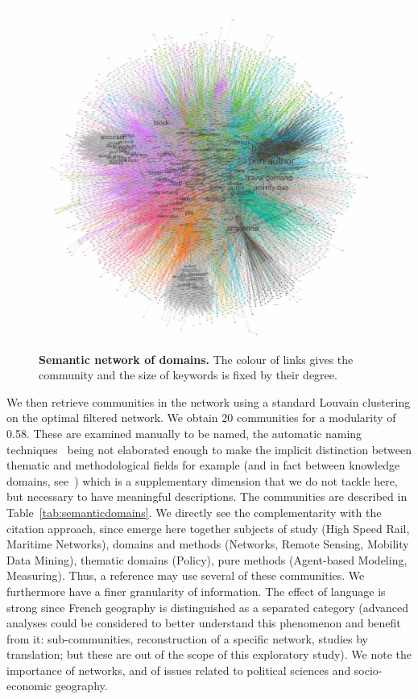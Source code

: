 \documentclass[10pt]{article}
\begin{document}
\begin{figure}
\includegraphics[width=\linewidth]{A-quantepistemo-semanticnw.jpg}
\caption{\textbf{Semantic network of domains.} The colour of links gives the community and the size of keywords is fixed by their degree.\label{fig:semanticnw}}
\end{figure}




We then retrieve communities in the network using a standard Louvain clustering on the optimal filtered network. We obtain 20 communities for a modularity of 0.58. These are examined manually to be named, the automatic naming techniques~\cite{yang2000improving} being not elaborated enough to make the implicit distinction between thematic and methodological fields for example (and in fact between knowledge domains, see~\cite{raimbault2017applied}) which is a supplementary dimension that we do not tackle here, but necessary to have meaningful descriptions. The communities are described in Table~\ref{tab:semanticdomains}. We directly see the complementarity with the citation approach, since emerge here together subjects of study (High Speed Rail, Maritime Networks), domains and methods (Networks, Remote Sensing, Mobility Data Mining), thematic domains (Policy), pure methods (Agent-based Modeling, Measuring). Thus, a reference may use several of these communities. We furthermore have a finer granularity of information. The effect of language is strong since French geography is distinguished as a separated category (advanced analyses could be considered to better understand this phenomenon and benefit from it: sub-communities, reconstruction of a specific network, studies by translation; but these are out of the scope of this exploratory study). We note the importance of networks, and of issues related to political sciences and socio-economic geography.
\end{document}
